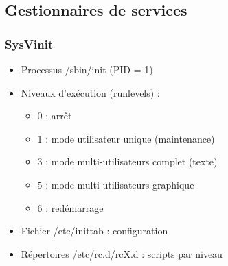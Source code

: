 \documentclass[12pt,a4paper]{article}
\begin{document}

\subsection{Gestionnaires de services}


\subsubsection{SysVinit}
\begin{itemize}
    \item Processus /sbin/init (PID = 1)
    \item Niveaux d'ex\'ecution (runlevels) :
    \begin{itemize}
        \item 0 : arr\^et
        \item 1 : mode utilisateur unique (maintenance)
        \item 3 : mode multi-utilisateurs complet (texte)
        \item 5 : mode multi-utilisateurs graphique
        \item 6 : red\'emarrage
    \end{itemize}
    \item Fichier /etc/inittab : configuration
    \item R\'epertoires /etc/rc.d/rcX.d : scripts par niveau
\end{itemize}

\end{document}
